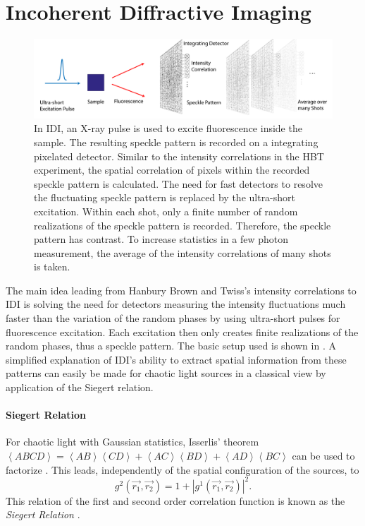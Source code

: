 \section{Incoherent Diffractive Imaging}
\begin{figure}
	\centering
\includegraphics[width=0.8\linewidth]{images/idi.pdf}
\caption[Main concept of IDI]{In IDI, an  X-ray pulse is used to excite fluorescence inside the sample. The resulting speckle pattern is recorded on a integrating pixelated detector. Similar to the intensity correlations in the HBT experiment, the spatial correlation of pixels within the recorded speckle pattern is calculated. The need for fast detectors to resolve the fluctuating speckle pattern is replaced by the ultra-short excitation. Within each shot, only a finite number of random realizations of the speckle pattern is recorded. Therefore, the speckle pattern has contrast. To increase statistics in a few photon measurement, the average of the intensity correlations of many shots is taken.}
\label{fig:idi}
\end{figure}
 The main idea leading from Hanbury Brown and Twiss's intensity correlations to IDI is solving the need for detectors measuring the intensity fluctuations much faster than the variation of the random phases by using ultra-short pulses for fluorescence excitation.  Each excitation then only creates finite realizations of the random phases, thus a speckle pattern. The basic setup used is shown in .
A simplified explanation of IDI's ability to extract spatial information from these patterns can easily be made for chaotic light sources in a classical view by application of the Siegert relation.

\paragraph{Siegert Relation}
\label{sec:idi}
For chaotic light with Gaussian statistics, Isserlis' theorem 
$\left<ABCD\right>=\left<AB\right>\left<CD\right>+\left<AC\right>\left<BD\right>+\left<AD\right>\left<BC\right>$ can be used to factorize . This leads,  independently of the spatial configuration of the sources, to
\begin{equation}
	g^2(\vec{r_1},\vec{r_2}) = 1+ |g^1(\vec{r_1},\vec{r_2}) |^2 .
\end{equation}
This relation of the first and second order correlation function is known as the \textit{Siegert Relation} \cite{ou2017}. 

